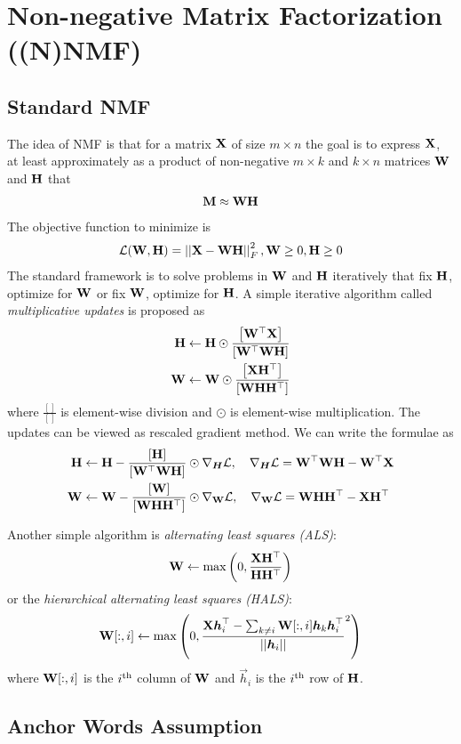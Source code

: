 \section{Non-negative Matrix Factorization ((N)NMF)}

\subsection{Standard NMF}

The idea of NMF is that for a matrix $\mathbf{X}$ of size $m\times n$ the goal is to express $\mathbf{X}$, at least approximately as a product of non-negative $m\times k$ and $k\times n$ matrices $\mathbf{W}$ and $\mathbf{H}$ that
\begin{align*}
	\mathbf{M}\approx\mathbf{W}\mathbf{H}
\end{align*}
The objective function to minimize is
\begin{align*}
	\mathcal{L}(\mathbf{W},\mathbf{H})=\left\vert\left\vert \mathbf{X}-\mathbf{W}\mathbf{H} \right\vert\right\vert_F^2,\mathbf{W}\geq 0,\mathbf{H}\geq 0
\end{align*}
The standard framework is to solve problems in $\mathbf{W}$ and $\mathbf{H}$ iteratively that fix $\mathbf{H}$, optimize for $\mathbf{W}$ or fix $\mathbf{W}$, optimize for $\mathbf{H}$. A simple iterative algorithm called \emph{multiplicative updates} is proposed as
\begin{align*}
	\mathbf{H}&\gets\mathbf{H}\odot\frac{\left[\mathbf{W}{}^\top\mathbf{X}\right]}{\left[\mathbf{W}{}^\top\mathbf{W}\mathbf{H}\right]} \\
	\mathbf{W}&\gets\mathbf{W}\odot\frac{\left[\mathbf{X}\mathbf{H}{}^\top\right]}{\left[\mathbf{W}\mathbf{H}\mathbf{H}{}^\top\right]}
\end{align*}
where $\frac{[]}{[]}$ is element-wise division and $\odot$ is element-wise multiplication. The updates can be viewed as rescaled gradient method. We can write the formulae as
\begin{align*}
	\mathbf{H}&\gets\mathbf{H}-\frac{\left[\mathbf{H}\right]}{\left[\mathbf{W}{}^\top\mathbf{W}\mathbf{H}\right]}\odot\nabla_{\boldsymbol{H}}\mathcal{L},\quad\nabla_{\boldsymbol{H}}\mathcal{L}=\mathbf{W}{}^\top\mathbf{W}\mathbf{H}-\mathbf{W}{}^\top\mathbf{X} \\
	\mathbf{W}&\gets\mathbf{W}-\frac{\left[\mathbf{W}\right]}{\left[\mathbf{W}\mathbf{H}\mathbf{H}{}^\top\right]}\odot\nabla_{\mathbf{W}}\mathcal{L},\quad\nabla_{\mathbf{W}}\mathcal{L}=\mathbf{W}\mathbf{H}\mathbf{H}{}^\top-\mathbf{X}\mathbf{H}{}^\top
\end{align*}

Another simple algorithm is \emph{alternating least squares (ALS)}:
\begin{align*}
	\mathbf{W}\gets\max\left(0,\frac{\mathbf{X}\mathbf{H}{}^\top}{\mathbf{H}\mathbf{H}{}^\top}\right)
\end{align*}
or the \emph{hierarchical alternating least squares (HALS)}:
\begin{align*}
	\mathbf{W}[:,i]\gets\max\left(0,\frac{\mathbf{X}\boldsymbol{h}_i^\top-\sum_{k\neq i}\mathbf{W}[:,i]\boldsymbol{h}_k\boldsymbol{h}_i^\top}{\left\vert\left\vert \boldsymbol{h}_i \right\vert\right\vert}^2\right)
\end{align*}
where $\mathbf{W}[:,i]$ is the $i^\text{th}$ column of $\mathbf{W}$ and $\vec{h}_i$ is the $i^\text{th}$ row of $\mathbf{H}$.

\subsection{Anchor Words Assumption}
